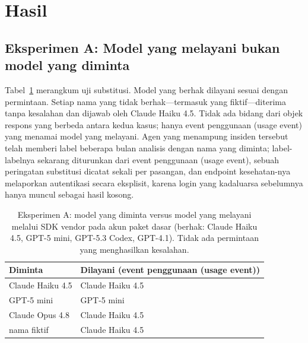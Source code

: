 \section{Hasil}
\label{sec:results}

\subsection{Eksperimen A: Model yang melayani bukan model yang diminta}
Tabel~\ref{tab:served} merangkum uji substitusi. Model yang berhak dilayani sesuai dengan permintaan. Setiap nama yang tidak berhak---termasuk yang fiktif---diterima tanpa kesalahan dan dijawab oleh Claude Haiku 4.5. Tidak ada bidang dari objek respons yang berbeda antara kedua kasus; hanya event penggunaan (usage event) yang menamai model yang melayani. Agen yang menampung insiden tersebut telah memberi label beberapa bulan analisis dengan nama yang diminta; label-labelnya sekarang diturunkan dari event penggunaan (usage event), sebuah peringatan substitusi dicatat sekali per pasangan, dan endpoint kesehatan-nya melaporkan autentikasi secara eksplisit, karena login yang kadaluarsa sebelumnya hanya muncul sebagai hasil kosong.

\begin{table}[t]
  \caption{Eksperimen A: model yang diminta versus model yang melayani melalui SDK vendor pada akun paket dasar (berhak: Claude Haiku 4.5, GPT-5 mini, GPT-5.3 Codex, GPT-4.1). Tidak ada permintaan yang menghasilkan kesalahan.}
  \label{tab:served}
  \centering
  \footnotesize
  \begin{tabular}{@{}ll@{}}
    \toprule
    Diminta & Dilayani (event penggunaan (usage event)) \\
    \midrule
    Claude Haiku 4.5 & Claude Haiku 4.5 \\
    GPT-5 mini & GPT-5 mini \\
    Claude Opus 4.8 & Claude Haiku 4.5 \\
    nama fiktif & Claude Haiku 4.5 \\
    \bottomrule
  \end{tabular}
\end{table}

